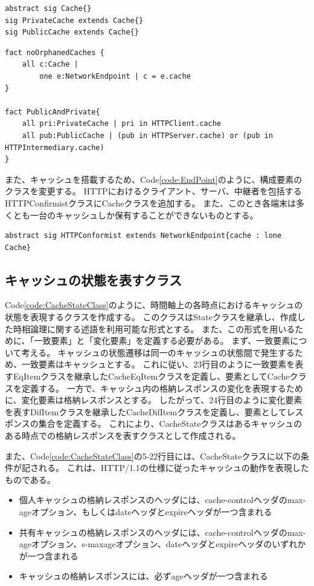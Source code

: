 \documentclass[12pt,a4paper]{jbook}
\begin{document}
\begin{lstlisting}[caption=Cacheクラス, label=code:CacheClass]
abstract sig Cache{}
sig PrivateCache extends Cache{}
sig PublicCache extends Cache{}
\end{lstlisting}

\begin{lstlisting}[caption=Cacheクラスの制限, label=code:LimitedCacheClass]
fact noOrphanedCaches {
	all c:Cache |
		one e:NetworkEndpoint | c = e.cache
}

fact PublicAndPrivate{
	all pri:PrivateCache | pri in HTTPClient.cache
	all pub:PublicCache | (pub in HTTPServer.cache) or (pub in HTTPIntermediary.cache)
}
\end{lstlisting}

また、キャッシュを搭載するため、Code\ref{code:EndPoint}のように、構成要素のクラスを変更する。
HTTPにおけるクライアント、サーバ、中継者を包括するHTTPConfirmistクラスにCacheクラスを追加する。
また、このとき各端末は多くとも一台のキャッシュしか保有することができないものとする。
\begin{lstlisting}[caption=HTTPを利用するウェブの構成要素, label=code:EndPoint]
abstract sig HTTPConformist extends NetworkEndpoint{cache : lone Cache}
\end{lstlisting}

\subsection{キャッシュの状態を表すクラス}
\label{sec:CacheClass}
Code\ref{code:CacheStateClass}のように、時間軸上の各時点におけるキャッシュの状態を表現するクラスを作成する。
このクラスはStateクラスを継承し、作成した時相論理に関する述語を利用可能な形式とする。
また、この形式を用いるために、「一致要素」と「変化要素」を定義する必要がある。
まず、一致要素について考える。
キャッシュの状態遷移は同一のキャッシュの状態間で発生するため、一致要素はキャッシュとする。
これに従い、23行目のように一致要素を表すEqItemクラスを継承したCacheEqItemクラスを定義し、要素としてCacheクラスを定義する。
一方で、キャッシュ内の格納レスポンスの変化を表現するために、変化要素は格納レスポンスとする。
したがって、24行目のように変化要素を表すDifItemクラスを継承したCacheDifItemクラスを定義し、要素としてレスポンスの集合を定義する。
これにより、CacheStateクラスはあるキャッシュのある時点での格納レスポンスを表すクラスとして作成される。

また、Code\ref{code:CacheStateClass}の5-22行目には、CacheStateクラスに以下の条件が記される。
これは、HTTP/1.1の仕様に従ったキャッシュの動作を表現したものである。
\begin{itemize}
\item 個人キャッシュの格納レスポンスのヘッダには、cache-controlヘッダのmax-ageオプション、もしくはdateヘッダとexpireヘッダが一つ含まれる
\item 共有キャッシュの格納レスポンスのヘッダには、cache-controlヘッダのmax-ageオプション、s-maxageオプション、dateヘッダとexpireヘッダのいずれかが一つ含まれる
\item キャッシュの格納レスポンスには、必ずageヘッダが一つ含まれる
\end{itemize}
\end{document}
